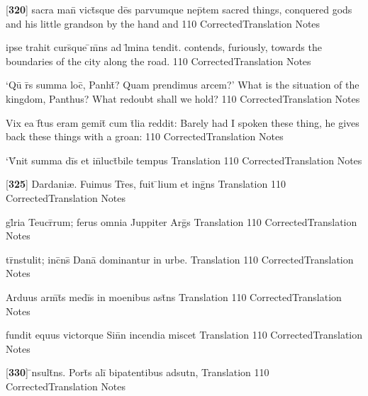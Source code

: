 \latline
  {[\textbf{320}] sacra man\={} vict\={}sque de\={}s parvumque nep\={}tem}
  { sacred things, conquered gods and his little grandson by the hand and  }
  {110}
  { CorrectedTranslation }
  { Notes }


\latline
  {ipse trahit curs\={}que \={}m\={}ns ad l\={\macron {\i}}mina tendit.}
  { contends, furiously, towards the boundaries of the city along the road. }
  {110}
  { CorrectedTranslation }
  { Notes }


\latline
  {`Qu\={} r\={}s summa loc\={}, Panht\={}?  Quam prendimus arcem?'}
  { What is the situation of the kingdom, Panthus?  What redoubt shall we hold? }
  {110}
  { CorrectedTranslation }
  { Notes }


\latline
  {Vix ea f\={}tus eram gemit\={} cum t\={}lia reddit:}
  { Barely had I spoken these thing, he gives back these things with a groan: }
  {110}
  { CorrectedTranslation }
  { Notes }


\latline
  {`V\={}nit summa di\={}s et in\={}luct\={}bile tempus}
  { Translation }
  {110}
  { CorrectedTranslation }
  { Notes }


\latline
  {[\textbf{325}] Dardani{\ae}.  Fuimus Tr\={}es, fuit \={}lium et ing\={}ns}
  { Translation }
  {110}
  { CorrectedTranslation }
  { Notes }


\latline
  {gl\={}ria Teucr\={}rum; ferus omnia Juppiter Arg\={}s}
  { Translation }
  {110}
  { CorrectedTranslation }
  { Notes }


\latline
  {tr\={}nstulit; inc\={}ns\={} Dana\={\macron {\i}} dominantur in urbe.}
  { Translation }
  {110}
  { CorrectedTranslation }
  { Notes }


\latline
  {Arduus arm\={}t\={}s medi\={\macron {\i}}s in moenibus ast\={}ns}
  { Translation }
  {110}
  { CorrectedTranslation }
  { Notes }


\latline
  {fundit equus victorque Sin\={}n incendia miscet}
  { Translation }
  {110}
  { CorrectedTranslation }
  { Notes }


\latline
  {[\textbf{330}] \={\macron {\i}}nsult\={}ns.  Port\={\macron {\i}}s ali\={\macron {\i}} bipatentibus adsutn,}
  { Translation }
  {110}
  { CorrectedTranslation }
  { Notes }


